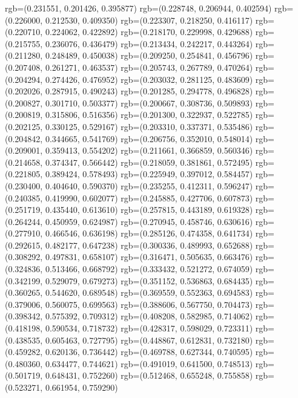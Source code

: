 {{{					rgb=(0.231551, 0.201426, 0.395877)
					rgb=(0.228748, 0.206944, 0.402594)
					rgb=(0.226000, 0.212530, 0.409350)
					rgb=(0.223307, 0.218250, 0.416117)
					rgb=(0.220710, 0.224062, 0.422892)
					rgb=(0.218170, 0.229998, 0.429688)
					rgb=(0.215755, 0.236076, 0.436479)
					rgb=(0.213434, 0.242217, 0.443264)
					rgb=(0.211280, 0.248489, 0.450038)
					rgb=(0.209250, 0.254841, 0.456796)
					rgb=(0.207408, 0.261271, 0.463537)
					rgb=(0.205743, 0.267789, 0.470264)
					rgb=(0.204294, 0.274426, 0.476952)
					rgb=(0.203032, 0.281125, 0.483609)
					rgb=(0.202026, 0.287915, 0.490243)
					rgb=(0.201285, 0.294778, 0.496828)
					rgb=(0.200827, 0.301710, 0.503377)
					rgb=(0.200667, 0.308736, 0.509893)
					rgb=(0.200819, 0.315806, 0.516356)
					rgb=(0.201300, 0.322937, 0.522785)
					rgb=(0.202125, 0.330125, 0.529167)
					rgb=(0.203310, 0.337371, 0.535486)
					rgb=(0.204842, 0.344665, 0.541769)
					rgb=(0.206756, 0.352010, 0.548014)
					rgb=(0.209001, 0.359413, 0.554202)
					rgb=(0.211661, 0.366859, 0.560346)
					rgb=(0.214658, 0.374347, 0.566442)
					rgb=(0.218059, 0.381861, 0.572495)
					rgb=(0.221805, 0.389424, 0.578493)
					rgb=(0.225949, 0.397012, 0.584457)
					rgb=(0.230400, 0.404640, 0.590370)
					rgb=(0.235255, 0.412311, 0.596247)
					rgb=(0.240385, 0.419990, 0.602077)
					rgb=(0.245885, 0.427706, 0.607873)
					rgb=(0.251719, 0.435440, 0.613610)
					rgb=(0.257815, 0.443189, 0.619328)
					rgb=(0.264244, 0.450959, 0.624987)
					rgb=(0.270945, 0.458746, 0.630616)
					rgb=(0.277910, 0.466546, 0.636198)
					rgb=(0.285126, 0.474358, 0.641734)
					rgb=(0.292615, 0.482177, 0.647238)
					rgb=(0.300336, 0.489993, 0.652688)
					rgb=(0.308292, 0.497831, 0.658107)
					rgb=(0.316471, 0.505635, 0.663476)
					rgb=(0.324836, 0.513466, 0.668792)
					rgb=(0.333432, 0.521272, 0.674059)
					rgb=(0.342199, 0.529079, 0.679273)
					rgb=(0.351152, 0.536863, 0.684435)
					rgb=(0.360265, 0.544620, 0.689548)
					rgb=(0.369559, 0.552363, 0.694583)
					rgb=(0.379006, 0.560075, 0.699563)
					rgb=(0.388606, 0.567750, 0.704473)
					rgb=(0.398342, 0.575392, 0.709312)
					rgb=(0.408208, 0.582985, 0.714062)
					rgb=(0.418198, 0.590534, 0.718732)
					rgb=(0.428317, 0.598029, 0.723311)
					rgb=(0.438535, 0.605463, 0.727795)
					rgb=(0.448867, 0.612831, 0.732180)
					rgb=(0.459282, 0.620136, 0.736442)
					rgb=(0.469788, 0.627344, 0.740595)
					rgb=(0.480360, 0.634477, 0.744621)
					rgb=(0.491019, 0.641500, 0.748513)
					rgb=(0.501719, 0.648431, 0.752260)
					rgb=(0.512468, 0.655248, 0.755858)
					rgb=(0.523271, 0.661954, 0.759290)
}}}
